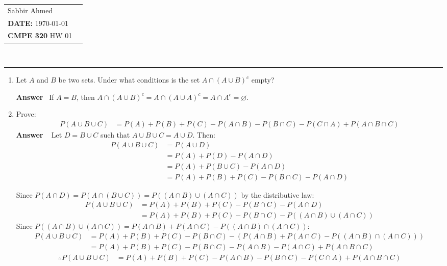 \documentclass[paper=usletter, fontsize=12pt]{article}
\newcommand{\documentinfo}[5]{
    \begin{centering}
        \parbox{2in}{
        \begin{spacing}{1}
            \begin{flushleft}
                \begin{tabular}{l l}
                    #1 \\
                    #2 \\
                    #3 \\
                \end{tabular}\\
                \rule{\textwidth}{1pt}
            \end{flushleft}
        \end{spacing}
        }
    \end{centering}
}
\newcommand{\ans}{\textbf{Answer} \ }
\begin{document}
    \documentinfo{Sabbir Ahmed}{\textbf{DATE:} \today}{\textbf{CMPE 320} HW 01}
    \vspace{-0.2in}

    \begin{enumerate}

        \item Let $A$ and $B$ be two sets. Under what conditions is the set $A
        \cap (A \cup B)^c$ empty?

        \ans If $A = B$, then $A \cap (A \cup B)^c = A \cap (A \cup A)^c = A
        \cap A^c = \varnothing$.

        \item Prove:
        \begin{align*}
            P(A \cup B \cup C) & = P(A) + P(B) + P(C) - P(A \cap B) - P(B
            \cap C) - P(C \cap A) + P(A \cap B \cap C)
        \end{align*}
        \ans
        Let $D = B \cup C$ such that $A \cup B \cup C = A \cup D$. Then:
        \begin{align*}
            P(A \cup B \cup C) & = P(A \cup D) \\
            & = P(A) + P(D) - P(A \cap D) \\
            & = P(A) + P(B \cup C) - P(A \cap D) \\
            & = P(A) + P(B) + P(C) - P(B \cap C) - P(A \cap D)
        \end{align*}

        Since $P(A \cap D) = P(A \cap (B \cup C) ) = P((A \cap B) \cup (A \cap
        C))$ by the distributive law:
        \begin{align*}
        P(A \cup B \cup C) & = P(A) + P(B) + P(C) - P(B \cap C) - P(A \cap
        D) \\
        & = P(A) + P(B) + P(C) - P(B \cap C) - P((A \cap B) \cup (A \cap C))
        \end{align*}
        Since $P((A \cap B) \cup (A \cap C)) = P(A \cap B) + P(A \cap C) - P((A
        \cap B) \cap (A \cap C))$:
        \begin{align*}
        P(A \cup B \cup C) & = P(A) + P(B) + P(C) - P(B \cap C) - (P(A \cap B) + P(A \cap C) -
        P((A \cap B) \cap (A \cap C))) \\
        & = P(A) + P(B) + P(C) - P(B \cap C) - P(A \cap B) - P(A \cap C) + P(A
        \cap B \cap C)
        \end{align*}
        \begin{align*}
            \therefore P(A \cup B \cup C) & = P(A) + P(B) + P(C) - P(A \cap B) - P(B
            \cap C) - P(C \cap A) + P(A \cap B \cap C)
        \end{align*}


\end{enumerate}
\end{document}

